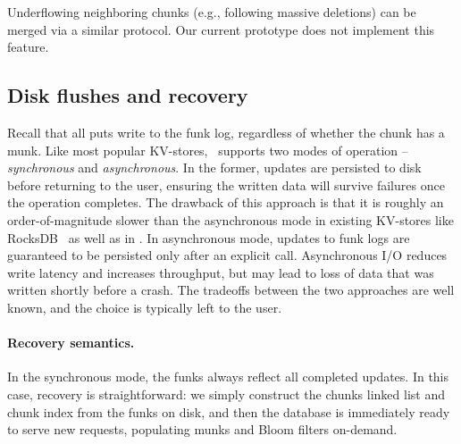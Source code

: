 
Underflowing neighboring chunks (e.g., following massive deletions) can be merged via a similar protocol. 
Our current \sys\/ prototype does not implement this feature. 

\subsection{Disk flushes and recovery}
\label{ssec:flush-recovery}

Recall that all puts write to the funk log, regardless of whether the chunk has a munk. Like most popular KV-stores, \sys\ supports 
two modes of operation -- \emph{synchronous} and \emph{asynchronous}. In the former,  updates are persisted to disk 
before returning to the user, ensuring the written data will survive failures once the operation completes. 
The drawback of this approach is that it is roughly an order-of-magnitude slower than the asynchronous mode in existing KV-stores 
like RocksDB~\cite{RocksDB} as well as in \sys. In asynchronous mode, updates to funk logs 
are guaranteed to be  persisted only after an explicit  call.  
Asynchronous I/O reduces write latency and increases throughput, but 
may lead to loss of data that was written shortly before a crash. The tradeoffs between the two approaches are 
well known, and the choice is typically left to the user.

\paragraph{Recovery semantics.}
In the synchronous mode, 
the funks always reflect all completed updates. In this case, recovery is straightforward: we simply construct
the chunks linked list and chunk index from the funks on disk, and then the database is immediately ready to serve new requests, populating munks and Bloom filters on-demand.  

